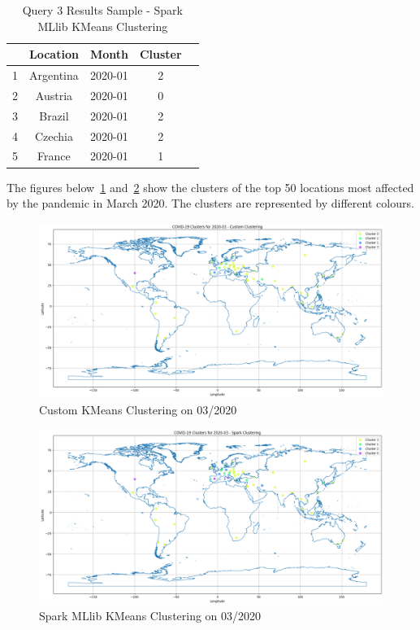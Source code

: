 \documentclass[12pt,oneside]{book} %
\begin{document}
\begin{table}[H]
    \centering
    \captionsetup{font=large}
    \caption{Query 3 Results Sample - Spark MLlib KMeans Clustering}
    \normalsize
    \begin{tabular}{|l|c|c|c|c|}
        \hline
          & Location  & Month   & Cluster \\
        \hline
        1 & Argentina & 2020-01 & 2       \\
        2 & Austria   & 2020-01 & 0       \\
        3 & Brazil    & 2020-01 & 2       \\
        4 & Czechia   & 2020-01 & 2       \\
        5 & France    & 2020-01 & 1       \\
        \hline
    \end{tabular}\label{tab:query3-spark-results-sample}
\end{table}

\newpage

The figures below~\ref{fig:covid-19-clusters-custom}
and~\ref{fig:covid-19-clusters-spark} show the clusters of the top 50 locations
most affected by the pandemic in March 2020. The clusters are represented by
different colours.

\begin{figure}[H]
    \centering
    \includegraphics[width=1\textwidth]{images/covid-19-clusters-custom.png}
    \caption{Custom KMeans Clustering on 03/2020}\label{fig:covid-19-clusters-custom}
\end{figure}

\begin{figure}[H]
    \centering
    \includegraphics[width=1\textwidth]{images/covid-19-clusters-spark.png}
    \caption{Spark MLlib KMeans Clustering on 03/2020}\label{fig:covid-19-clusters-spark}
\end{figure}
\end{document}
